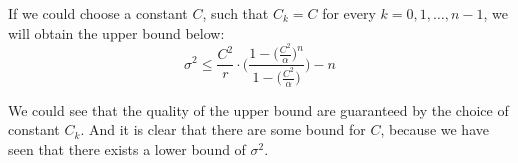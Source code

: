 \documentclass[a4paper,10pt]{article}
\begin{document}
If we could choose a constant $C$, such that $C_k = C$ for every $k = 0,1,\dots,n-1$, we will obtain the upper bound below:
$$\sigma^2 \leq \frac{C^2}{r} \cdot \Bigg( \frac{1 - \big(\frac{C^2}{\alpha}\big)^{n} }{1 - \big(\frac{C^2}{\alpha}\big)}\Bigg) - n$$

We could see that the quality of the upper bound are guaranteed by the choice of constant $C_k$. And it is clear that there are some bound for $C$, because we have seen that there exists a lower bound of $\sigma^2$.










\end{document}
